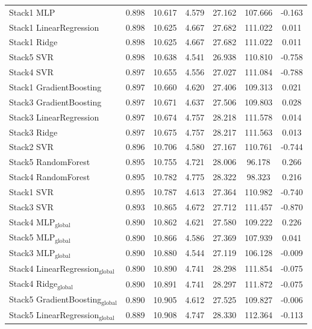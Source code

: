 \begin{table}
{\begin{tabular}{p{4.5cm}cccccc}
        Stack1 MLP & 0.898 & 10.617 & 4.579 & 27.162 & 107.666 & -0.163 \\
        Stack1 LinearRegression & 0.898 & 10.625 & 4.667 & 27.682 & 111.022 & 0.011 \\
        Stack1 Ridge & 0.898 & 10.625 & 4.667 & 27.682 & 111.022 & 0.011 \\
        Stack5 SVR & 0.898 & 10.638 & 4.541 & 26.938 & 110.810 & -0.758 \\
        Stack4 SVR & 0.897 & 10.655 & 4.556 & 27.027 & 111.084 & -0.788 \\
        Stack1 GradientBoosting & 0.897 & 10.660 & 4.620 & 27.406 & 109.313 & 0.021 \\
        Stack3 GradientBoosting & 0.897 & 10.671 & 4.637 & 27.506 & 109.803 & 0.028 \\
        Stack3 LinearRegression & 0.897 & 10.674 & 4.757 & 28.218 & 111.578 & 0.014 \\
        Stack3 Ridge & 0.897 & 10.675 & 4.757 & 28.217 & 111.563 & 0.013 \\
        Stack2 SVR & 0.896 & 10.706 & 4.580 & 27.167 & 110.761 & -0.744 \\
        Stack5 RandomForest & 0.895 & 10.755 & 4.721 & 28.006 & 96.178 & 0.266 \\
        Stack4 RandomForest & 0.895 & 10.782 & 4.775 & 28.322 & 98.323 & 0.216 \\
        Stack1 SVR & 0.895 & 10.787 & 4.613 & 27.364 & 110.982 & -0.740 \\
        Stack3 SVR & 0.893 & 10.865 & 4.672 & 27.712 & 111.457 & -0.870 \\
        Stack4 MLP$_{\text{global}}$ & 0.890 & 10.862 & 4.621 & 27.580 & 109.222 & 0.226 \\
        Stack5 MLP$_{\text{global}}$ & 0.890 & 10.866 & 4.586 & 27.369 & 107.939 & 0.041 \\
        Stack3 MLP$_{\text{global}}$ & 0.890 & 10.880 & 4.544 & 27.119 & 106.128 & -0.009 \\
        Stack4 LinearRegression$_{\text{global}}$ & 0.890 & 10.890 & 4.741 & 28.298 & 111.854 & -0.075 \\
        Stack4 Ridge$_{\text{global}}$ & 0.890 & 10.891 & 4.741 & 28.297 & 111.872 & -0.075 \\
        Stack5 GradientBoosting$_{\text{global}}$ & 0.890 & 10.905 & 4.612 & 27.525 & 109.827 & -0.006 \\
        Stack5 LinearRegression$_{\text{global}}$ & 0.889 & 10.908 & 4.747 & 28.330 & 112.364 & -0.113 \\

\end{tabular}}
\end{table}
